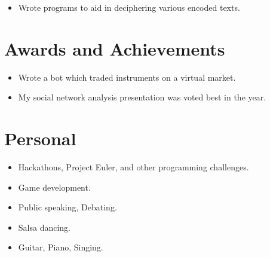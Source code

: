 \documentclass{jcgcv}
\begin{document}
\begin{column}
\begin{itemize}
  \item Wrote programs to aid in deciphering various encoded texts.
\end{itemize}



\section{Awards and Achievements}

\begin{itemize}
  \item Wrote a bot which traded instruments on a virtual market.
\end{itemize}

\begin{itemize}
  \item My social network analysis presentation was voted best in the year.
\end{itemize}



\section{Personal}

\begin{itemize}
  \item Hackathons, Project Euler, and other programming challenges.
  \item Game development.
  \item Public speaking, Debating.
  \item Salsa dancing.
  \item Guitar, Piano, Singing.
\end{itemize}


\end{column}
\end{document}
